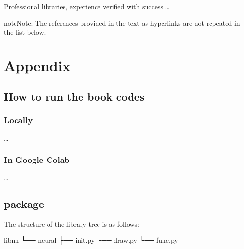 \documentclass[letterpaper,10pt,english]{jupyterBook}
\begin{document}
\sphinxAtStartPar
Professional libraries, experience verified with success …

\begin{sphinxadmonition}{note}{Note:}
\sphinxAtStartPar
The references provided in the text as hyperlinks are not repeated in the list below.
\end{sphinxadmonition}

\sphinxAtStartPar



\chapter{Appendix}
\label{\detokenize{docs/appendix:appendix}}\label{\detokenize{docs/appendix::doc}}

\section{How to run the book codes}
\label{\detokenize{docs/appendix:how-to-run-the-book-codes}}

\subsection{Locally}
\label{\detokenize{docs/appendix:locally}}
\sphinxAtStartPar
…


\subsection{In Google Colab}
\label{\detokenize{docs/appendix:in-google-colab}}
\sphinxAtStartPar
…


\section{ package}
\label{\detokenize{docs/appendix:neural-package}}\label{\detokenize{docs/appendix:app-lab}}
\sphinxAtStartPar
The structure of the library tree is as follows:

\begin{sphinxVerbatim}[commandchars=\\\{\}]
lib\PYGZus{}nn
└── neural
    ├── \PYGZus{}\PYGZus{}init\PYGZus{}\PYGZus{}.py
    ├── draw.py
    └── func.py
\end{sphinxVerbatim}
\end{document}
